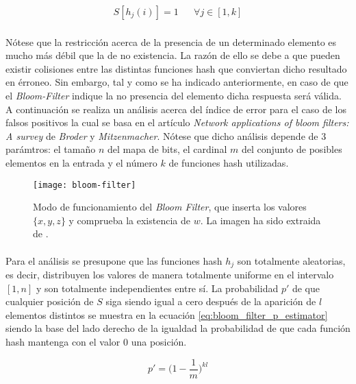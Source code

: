 \documentclass{subfiles}
\begin{document}
      \begin{align}
      \label{eq:bloom_filter_update}
        S[h_j(i)] = 1 && \forall j \in [1,k]
      \end{align}

      \paragraph{}
      Nótese que la restricción acerca de la presencia de un determinado elemento es mucho más débil que la de no existencia. La razón de ello se debe a que pueden existir colisiones entre las distintas funciones hash que conviertan dicho resultado en érroneo. Sin embargo, tal y como se ha indicado anteriormente, en caso de que el \emph{Bloom-Filter} indique la no presencia del elemento dicha respuesta será válida. A continuación se realiza un análisis acerca del índice de error para el caso de los falsos positivos la cual se basa en el artículo \emph{Network applications of bloom filters: A survey} \cite{broder2004network} de \emph{Broder} y \emph{Mitzenmacher}. Nótese que dicho análisis depende de 3 parámtros: el tamaño $n$ del mapa de bits, el cardinal $m$ del conjunto de posibles elementos en la entrada y el número $k$ de funciones hash utilizadas.

      \begin{figure}
        \centering
        \texttt{[image: bloom-filter]}
        \caption{Modo de funcionamiento del \emph{Bloom Filter}, que inserta los valores $\{ x, y, z\}$ y comprueba la existencia de $w$. La imagen ha sido extraida de \cite{wiki:Bloom_filter}.}
        \label{fig:bloom_filter}
      \end{figure}

      \paragraph{}
      Para el análisis se presupone que las funciones hash $h_j$ son totalmente aleatorias, es decir, distribuyen los valores de manera totalmente uniforme en el intervalo $[1,n]$ y son totalmente independientes entre sí. La probabilidad $p'$ de que cualquier posición de $S$ siga siendo igual a cero después de la aparición de $l$ elementos distintos se muestra en la ecuación \eqref{eq:bloom_filter_p_estimator} siendo la base del lado derecho de la igualdad la probabilidad de que cada función hash mantenga con el valor $0$ una posición.

      \begin{equation}
      \label{eq:bloom_filter_p_estimator}
       p' = \bigg(1-\frac{1}{m}\bigg)^{kl}
      \end{equation}
\end{document}
